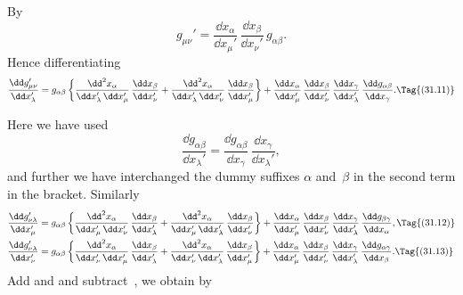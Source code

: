 \documentclass[12pt]{book}
\begin{document}

By~
\[
g_{\mu\nu}' = \frac{\dd x_{\alpha}}{\dd x_{\mu}'}\, \frac{\dd x_{\beta}}{\dd x_{\nu}'}\, g_{\alpha\beta}.
\]
Hence differentiating
\[
\frac{\dd g_{\mu\nu}'}{\dd x_{\lambda}'}
= g_{\alpha\beta} \left\{
    \frac{\dd^{2} x_{\alpha}}{\dd x_{\lambda}'\, \dd x_{\mu}'}\, \frac{\dd x_{\beta}}{\dd x_{\nu}'}
  + \frac{\dd^{2} x_{\alpha}}{\dd x_{\lambda}'\, \dd x_{\nu}'}\, \frac{\dd x_{\beta}}{\dd x_{\mu}'}\right\}
  + \frac{\dd x_{\alpha}}{\dd x_{\mu}'}\,
    \frac{\dd x_{\beta}}{\dd x_{\nu}'}\,
    \frac{\dd x_{\gamma}}{\dd x_{\lambda}'}\,
    \frac{\dd g_{\alpha\beta}}{\dd x_{\gamma}}.
\Tag{(31.11)}
\]

Here we have used
\[
\frac{\dd g_{\alpha\beta}}{\dd x_{\lambda}'}
= \frac{\dd g_{\alpha\beta}}{\dd x_{\gamma}}\, \frac{\dd x_{\gamma}}{\dd x_{\lambda}'},
\]
and further we have interchanged the dummy suffixes $\alpha$ and~$\beta$ in the second
term in the bracket. Similarly
\begin{align*}
  \frac{\dd g_{\nu\lambda}'}{\dd x_{\mu}'}
  &= g_{\alpha\beta} \left\{
    \frac{\dd^{2} x_{\alpha}}{\dd x_{\mu}'\, \dd x_{\nu}'}\, \frac{\dd x_{\beta}}{\dd x_{\lambda}'}
  + \frac{\dd^{2} x_{\alpha}}{\dd x_{\mu}'\, \dd x_{\lambda}'}\, \frac{\dd x_{\beta}}{\dd x_{\nu}'}\right\}
  + \frac{\dd x_{\alpha}}{\dd x_{\mu}'}\,
    \frac{\dd x_{\beta}}{\dd x_{\nu}'}\,
    \frac{\dd x_{\gamma}}{\dd x_{\lambda}'}\,
    \frac{\dd g_{\beta\gamma}}{\dd x_{\alpha}},
  \Tag{(31.12)} \\
  \frac{\dd g_{\nu\lambda}'}{\dd x_{\nu}'}
  &= g_{\alpha\beta} \left\{
    \frac{\dd^{2} x_{\alpha}}{\dd x_{\nu}'\, \dd x_{\mu}'}\, \frac{\dd x_{\beta}}{\dd x_{\lambda}'}
  + \frac{\dd^{2} x_{\alpha}}{\dd x_{\nu}'\, \dd x_{\lambda}'}\, \frac{\dd x_{\beta}}{\dd x_{\mu}'}\right\}
  + \frac{\dd x_{\alpha}}{\dd x_{\mu}'}\,
    \frac{\dd x_{\beta}}{\dd x_{\nu}'}\,
    \frac{\dd x_{\gamma}}{\dd x_{\lambda}'}\,
    \frac{\dd g_{\alpha\gamma}}{\dd x_{\beta}}.
\Tag{(31.13)}
\end{align*}
Add  and  and subtract~, we obtain by~
\end{document}
